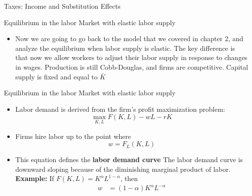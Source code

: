 \documentclass[10pt,aspectratio=169]{beamer}
\begin{document}
\begin{frame}{Taxes: Income and Substitution Effects}
\begin{center}
\end{center}
\end{frame}

\begin{frame}{Equilibrium in the labor Market with elastic labor supply}
\begin{itemize}
\item Now we are going to go back to the model that we covered in chapter 2, and analyze the equilibrium when labor supply is elastic.
\itemvso The key difference is that now we allow workers to adjust their labor supply in response to changes in wages.
\itemvso Production is still Cobb-Douglas, and firms are competitive.
\itemvso Capital supply is fixed and equal to $\bar{K}$
\end{itemize}
\end{frame}

\begin{frame}{Equilibrium in the labor Market with elastic labor supply}
\begin{itemize}
    \item Labor demand is derived from the firm’s profit maximization problem:
    \[
    \max_{K,L} F(K,L) - wL - rK
    \]  
    \vspace{-0.3cm}
    \item Firms hire labor up to the point where
    \[
    w = F_L(K,L)
    \]
    \vspace{-0.3cm}
    \item This equation defines the \textbf{labor demand curve}
\itemvso The labor demand curve is downward sloping because of the diminishing marginal product of labor.
\itemvso \textbf{Example:} If $F(K,L)=K^{\alpha}L^{1-\alpha}$, then
\[
\begin{aligned}
w &= (1-\alpha)K^{\alpha}L^{-\alpha}
\end{aligned}
\]
\end{itemize}
\end{frame}
\end{document}
